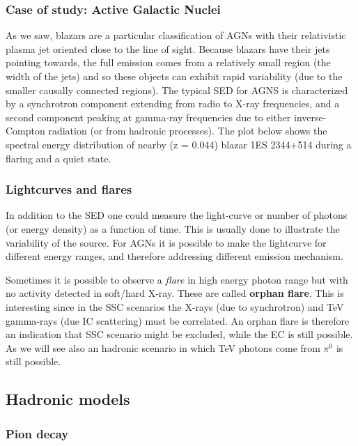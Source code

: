 \documentclass[
  letterpaper,
  DIV=11,
  numbers=noendperiod]{scrreprt}
\begin{document}
\subsubsection{Case of study: Active Galactic
Nuclei}\label{case-of-study-active-galactic-nuclei}

As we saw, blazars are a particular classification of AGNs with their
relativistic plasma jet oriented close to the line of sight. Because
blazars have their jets pointing towards, the full emission comes from a
relatively small region (the width of the jets) and so these objects can
exhibit rapid variability (due to the smaller causally connected
regions). The typical SED for AGNS is characterized by a synchrotron
component extending from radio to X-ray frequencies, and a second
component peaking at gamma-ray frequencies due to either inverse-Compton
radiation (or from hadronic processes). The plot below shows the
spectral energy distribution of nearby (z = 0.044) blazar 1ES 2344+514
during a flaring and a quiet state.

\subsubsection{Lightcurves and flares}\label{lightcurves-and-flares}

In addition to the SED one could measure the light-curve or number of
photons (or energy density) as a function of time. This is usually done
to illustrate the variability of the source. For AGNs it is possible to
make the lightcurve for different energy ranges, and therefore
addressing different emission mechanism.

Sometimes it is possible to observe a \emph{flare} in high energy photon
range but with no activity detected in soft/hard X-ray. These are called
\textbf{orphan flare}. This is interesting since in the SSC scenarios
the X-rays (due to synchrotron) and TeV gamma-rays (due IC scattering)
must be correlated. An orphan flare is therefore an indication that SSC
scenario might be excluded, while the EC is still possible. As we will
see also an hadronic scenario in which TeV photons come from \(\pi^0\)
is still possible.

\subsection{Hadronic models}\label{hadronic-models}

\subsubsection{Pion decay}\label{pion-decay}
\end{document}
